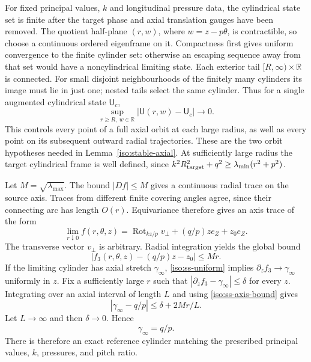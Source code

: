 \documentclass[11pt,a4paper]{article}
\numberwithin{equation}{section}
\theoremstyle{plain}
\theoremstyle{definition}
\theoremstyle{remark}
\begin{document}
For fixed principal values, $k$ and longitudinal pressure data, the cylindrical state set
is finite after the target phase and axial translation gauges have been
removed.    The quotient half-plane
$(r,w)$, where $w=z-p\theta$, is contractible, so choose a continuous
ordered eigenframe on it.  Compactness first gives uniform convergence
to the finite cylinder set: otherwise an escaping sequence away from
that set would have a noncylindrical limiting state.  Each exterior tail
$[R,\infty)\times\mathbb R$ is connected.  For small disjoint
neighbourhoods of the finitely many cylinders its image must lie in just
one; nested tails select the same cylinder.  Thus for a single augmented cylindrical state $\mathsf U_c$,
\begin{equation}\label{iso:ss-uniform}
 \sup_{r\ge R,\ w\in\mathbb R}|\mathsf U(r,w)-\mathsf U_c|\longrightarrow0.
\end{equation}
This controls every point of a full axial orbit at each large radius,
as well as every point on its subsequent outward radial trajectories.
These are the two orbit hypotheses needed in Lemma~\ref{iso:stable-axial}.
At sufficiently large radius the target cylindrical frame is well defined, since
$k^2R_{\rm target}^2+q^2\ge\lambda_{\min}(r^2+p^2)$.

Let $M=\sqrt{\lambda_{\max}}$.  The bound $|Df|\le M$ gives a continuous
radial trace on the source axis.  Traces from different finite covering
angles agree, since their connecting arc has length $O(r)$.  Equivariance
therefore gives an axis trace of the form
\begin{equation}\label{iso:ss-axis-trace}
 \lim_{r\downarrow0}f(r,\theta,z)
 =\operatorname{Rot}_{kz/p}v_\perp+(q/p)ze_Z+z_0e_Z.
\end{equation}
The transverse vector $v_\perp$ is arbitrary.  Radial integration yields the global bound
\begin{equation}\label{iso:ss-axis-bound}
 |f_3(r,\theta,z)-(q/p)z-z_0|\le Mr.
\end{equation}
If the limiting cylinder has axial stretch $\gamma_\infty$,
\eqref{iso:ss-uniform} implies $\partial_zf_3\to\gamma_\infty$ uniformly in
$z$.  Fix a sufficiently large $r$ such that
$|\partial_zf_3-\gamma_\infty|\le\delta$ for every $z$.  Integrating over an
axial interval of length $L$ and using \eqref{iso:ss-axis-bound} gives
\[
 |\gamma_\infty-q/p|\le\delta+2Mr/L.
\]
Let $L\to\infty$ and then $\delta\to0$.  Hence
\begin{equation}\label{iso:ss-pitch-match}
 \gamma_\infty=q/p.
\end{equation}
There is therefore an exact reference cylinder matching the prescribed principal values,
$k$, pressures, and pitch ratio.
\end{document}
